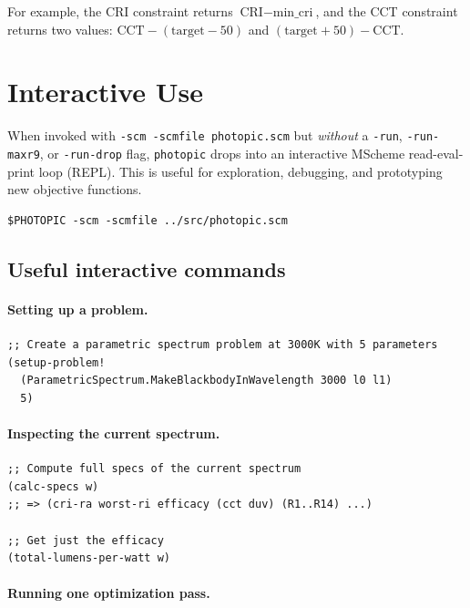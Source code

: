 \documentclass[11pt]{article}
\newcommand{\photopic}{\texttt{photopic}}
\newcommand{\cmd}[1]{\texttt{#1}}
\begin{document}
For example, the CRI constraint returns $\text{CRI} - \text{min\_cri}$,
and the CCT constraint returns two values: $\text{CCT} - (\text{target} - 50)$
and $(\text{target} + 50) - \text{CCT}$.

\section{Interactive Use}
\label{sec:interactive}

When invoked with \cmd{-scm -scmfile photopic.scm} but \emph{without}
a \cmd{-run}, \cmd{-run-maxr9}, or \cmd{-run-drop} flag, \photopic{}
drops into an interactive MScheme read-eval-print loop (REPL).
This is useful for exploration, debugging, and prototyping new objective
functions.

\begin{lstlisting}[style=shell]
$PHOTOPIC -scm -scmfile ../src/photopic.scm
\end{lstlisting}

\subsection{Useful interactive commands}

\paragraph{Setting up a problem.}

\begin{lstlisting}[style=scheme]
;; Create a parametric spectrum problem at 3000K with 5 parameters
(setup-problem!
  (ParametricSpectrum.MakeBlackbodyInWavelength 3000 l0 l1)
  5)
\end{lstlisting}

\paragraph{Inspecting the current spectrum.}

\begin{lstlisting}[style=scheme]
;; Compute full specs of the current spectrum
(calc-specs w)
;; => (cri-ra worst-ri efficacy (cct duv) (R1..R14) ...)

;; Get just the efficacy
(total-lumens-per-watt w)
\end{lstlisting}

\paragraph{Running one optimization pass.}
\end{document}
